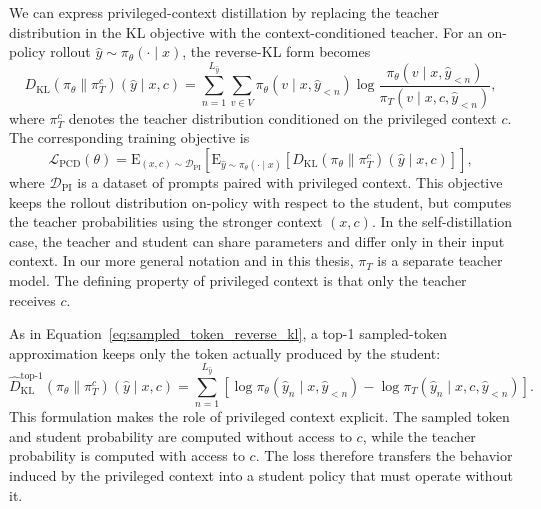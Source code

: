 We can express privileged-context distillation by replacing the teacher distribution in the KL objective with the context-conditioned teacher. For an on-policy rollout $\hat{y} \sim \pi_\theta(\cdot \mid x)$, the reverse-KL form becomes
%
\begin{equation}
D_{\mathrm{KL}}(\pi_\theta \| \pi_T^c)(\hat{y} \mid x, c)
= \sum_{n=1}^{L_{\hat{y}}} \sum_{v \in V}
\pi_\theta(v \mid x, \hat{y}_{<n})
\log
\frac{\pi_\theta(v \mid x, \hat{y}_{<n})}
{\pi_T(v \mid x, c, \hat{y}_{<n})},
\label{eq:privileged_context_reverse_kl}
\end{equation}
%
where $\pi_T^c$ denotes the teacher distribution conditioned on the privileged context $c$. The corresponding training objective is
%
\begin{equation}
\mathcal{L}_{\mathrm{PCD}}(\theta)
=
\mathrm{E}_{(x,c) \sim \mathcal{D}_{\mathrm{PI}}}
\left[
\mathrm{E}_{\hat{y} \sim \pi_\theta(\cdot \mid x)}
\left[
D_{\mathrm{KL}}(\pi_\theta \| \pi_T^c)(\hat{y} \mid x, c)
\right]
\right],
\label{eq:privileged_context_distillation}
\end{equation}
%
where $\mathcal{D}_{\mathrm{PI}}$ is a dataset of prompts paired with privileged context. This objective keeps the rollout distribution on-policy with respect to the student, but computes the teacher probabilities using the stronger context $(x,c)$. In the self-distillation case, the teacher and student can share parameters and differ only in their input context. In our more general notation and in this thesis, $\pi_T$ is a separate teacher model. The defining property of privileged context is that only the teacher receives $c$.

As in Equation~\ref{eq:sampled_token_reverse_kl}, a top-1 sampled-token approximation keeps only the token actually produced by the student:
%
\begin{equation}
\widehat{D}_{\mathrm{KL}}^{\mathrm{top}\mbox{-}1}
(\pi_\theta \| \pi_T^c)(\hat{y} \mid x, c)
= \sum_{n=1}^{L_{\hat{y}}}
\left[
\log \pi_\theta(\hat{y}_n \mid x, \hat{y}_{<n})
- \log \pi_T(\hat{y}_n \mid x, c, \hat{y}_{<n})
\right].
\label{eq:privileged_context_sampled_reverse_kl}
\end{equation}
%
This formulation makes the role of privileged context explicit. The sampled token and student probability are computed without access to $c$, while the teacher probability is computed with access to $c$. The loss therefore transfers the behavior induced by the privileged context into a student policy that must operate without it.

